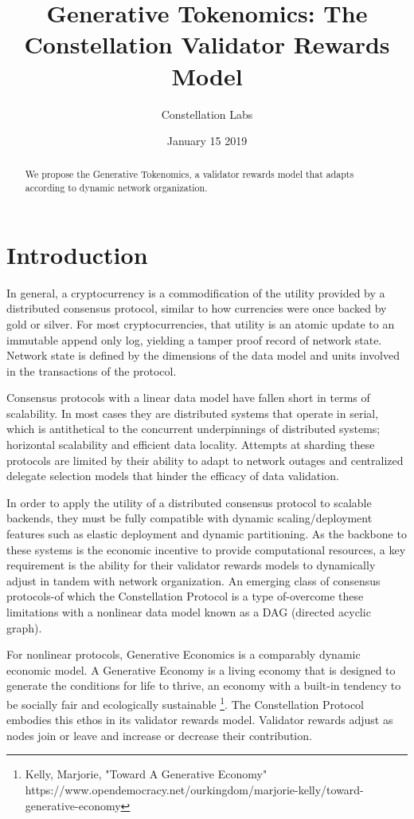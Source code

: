 \documentclass{article}
\title{Generative Tokenomics: The Constellation Validator Rewards Model}
\author{Constellation Labs}
\date{January 15 2019}
\begin{document}
\maketitle

\begin{abstract}
We propose the Generative Tokenomics, a validator rewards model that adapts according to dynamic network organization.
\end{abstract}
\setcounter{secnumdepth}{0}
\section{Introduction}
In general, a cryptocurrency is a commodification of the utility provided by a distributed consensus protocol, similar to how currencies were once backed by gold or silver. For most cryptocurrencies, that utility is an atomic update to an immutable append only log, yielding a tamper proof record of network state. Network state is defined by the dimensions of the data model and units involved in the transactions of the protocol. 

Consensus protocols with a linear data model have fallen short in terms of scalability. In most cases they are distributed systems that operate in serial, which is antithetical to the concurrent underpinnings of distributed systems; horizontal scalability and efficient data locality. Attempts at sharding these protocols are limited by their ability to adapt to network outages and centralized delegate selection models that hinder the efficacy of data validation. 

In order to apply the utility of a distributed consensus protocol to scalable backends, they must be fully compatible with dynamic scaling/deployment features such as elastic deployment and dynamic partitioning. As the backbone to these systems is the economic incentive to provide computational resources, a key requirement is the ability for their validator rewards models to dynamically adjust in tandem with network organization. An emerging class of consensus protocols-of which the Constellation Protocol is a type of-overcome these limitations with a nonlinear data model known as a DAG (directed acyclic graph).

For nonlinear protocols, Generative Economics is a comparably dynamic economic model. A Generative Economy is a living economy that is designed to generate the conditions for life to thrive, an economy with a built-in tendency to be socially fair and ecologically sustainable \footnote{Kelly, Marjorie, "Toward A Generative Economy" https://www.opendemocracy.net/ourkingdom/marjorie-kelly/toward-generative-economy}. The Constellation Protocol embodies this ethos in its validator rewards model. Validator rewards adjust as nodes join or leave and increase or decrease their contribution.
\end{document}
